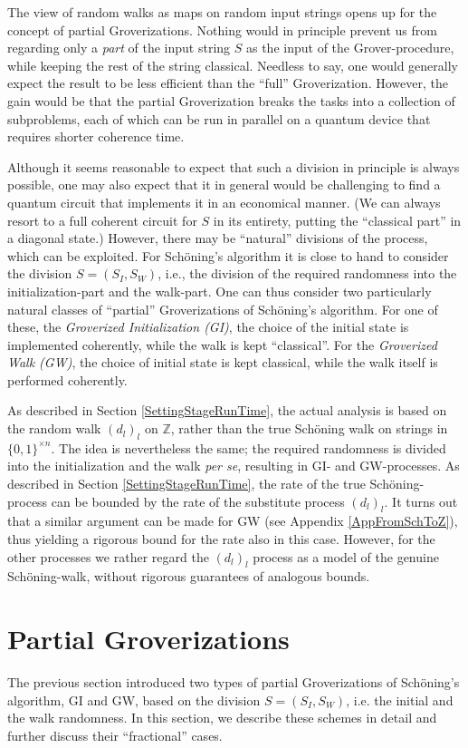 \documentclass[a4paper,aps,floatfix]{revtex4}
\begin{document}
The view of random walks as maps on random input strings opens up for the concept of partial Groverizations. 
Nothing would in principle prevent us from regarding only a \emph{part} of the input string $S$ as the input of the Grover-procedure, while keeping the rest of the string classical. 
Needless to say, one would generally expect the result to be less efficient than the ``full'' Groverization. 
However, the gain would be that the partial Groverization breaks the tasks into a collection of subproblems, each of which can be run in parallel on a quantum device that requires shorter coherence time. 

Although it seems reasonable to expect that such a division in principle is always possible, one may also expect that it in general would be challenging to find a quantum circuit that implements it in an economical manner. 
(We can always resort to a full coherent circuit for $S$ in its entirety, putting the ``classical part'' in a diagonal state.) 
However, there may be ``natural'' divisions of the process, which can be exploited. 
For  Sch\"oning's algorithm it is close to hand to consider the division $S = (S_I, S_W)$, i.e., the division of the required randomness into the initialization-part and the walk-part. 
One can thus consider two particularly natural classes of ``partial'' Groverizations of Sch\"oning's algorithm. 
For one of these, the \emph{Groverized Initialization (GI)}, the choice of the initial state is implemented coherently, while the walk is kept ``classical''. 
For the \emph{Groverized Walk (GW)}, the choice of initial state is kept classical, while the walk itself is performed coherently. 


As described in Section \ref{SettingStageRunTime}, the actual analysis is based on the random walk $(d_l)_l$ on $\mathbb{Z}$, rather than the true Sch\"oning walk on strings in $\{0,1\}^{\times n}$. 
The idea is nevertheless the same; the required randomness is divided into the initialization and the walk \emph{per se}, resulting in GI- and GW-processes. 
As described in Section \ref{SettingStageRunTime}, the rate of the true Sch\"oning-process can be bounded by the rate of the substitute process $(d_l)_l$. It turns out that a similar argument can be made for GW (see Appendix \ref{AppFromSchToZ}), thus yielding a rigorous bound for the rate also in this case.  However, for the other processes we rather regard the $(d_l)_l$ process as a model of the genuine Sch\"oning-walk, without rigorous guarantees of analogous bounds.


\section{\label{partialgrover}Partial Groverizations}
The previous section introduced two types of partial Groverizations of Sch\"oning's algorithm, GI and GW, based on the division $S = (S_I, S_W)$, i.e. the initial and the walk randomness. In this section, we describe these schemes in detail and further discuss their ``fractional'' cases.
\end{document}
